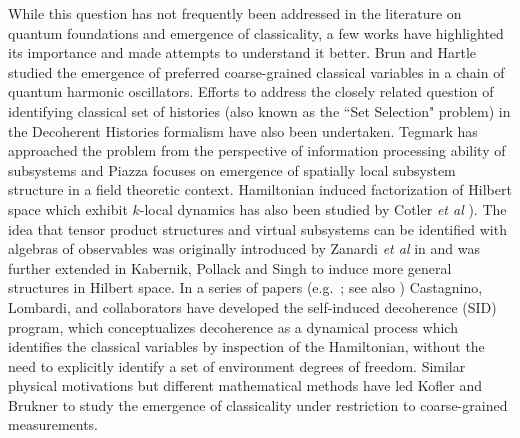 \documentclass[aps,pra,onecolumn,nofootinbib,11pt,tightenlines]{revtex4-1}
\begin{document}
While this question has not frequently been addressed in the literature on quantum foundations and emergence of classicality, 
a few works have highlighted its importance and made attempts to understand it better. Brun and Hartle \cite{brun1999classical} studied 
the emergence of preferred coarse-grained classical variables in a chain of quantum harmonic oscillators. Efforts to address the closely related 
question of identifying classical set of histories (also known as the ``Set Selection" problem) in the Decoherent Histories 
formalism \cite{gell2019alternative,dowker1996consistent,kent1998quantum,riedel2012,Griffiths:1984rx,paz1993environment} have also been undertaken.
 Tegmark \cite{tegmark2015consciousness} has approached the problem from the perspective of information processing ability of subsystems and
 Piazza \cite{Piazza:2005wm} focuses on emergence of spatially local subsystem structure in a field theoretic context. 
Hamiltonian induced factorization of Hilbert space which exhibit $k$-local dynamics has also been studied by Cotler
 \emph{et al} \cite{cotler2019locality}). The idea that tensor product structures and virtual subsystems can be identified with algebras
 of observables was originally introduced by Zanardi \emph{et al} in \cite{Zanardi:2001zz,Zanardi:2004zz} and was further extended in
 Kabernik, Pollack and Singh \cite{Kabernik:2019jko} to induce more general structures in Hilbert space. In a series of papers
 (e.g.\ \cite{2004SHPMP..35...73C,Castagnino:2008zz,10.1007/978-94-007-2404-4_15,2014BrJPh..44..138F}; see also \cite{2005PhRvA..72a2109S})
 Castagnino, Lombardi, and collaborators have developed the self-induced decoherence (SID) program, which conceptualizes decoherence as a
 dynamical process which identifies the classical variables by inspection of the Hamiltonian, without the need to explicitly identify a
 set of environment degrees of freedom. Similar physical motivations but different mathematical methods have led Kofler and 
Brukner \cite{2007PhRvL..99r0403K} to study the emergence of classicality under restriction to coarse-grained measurements.
\end{document}
